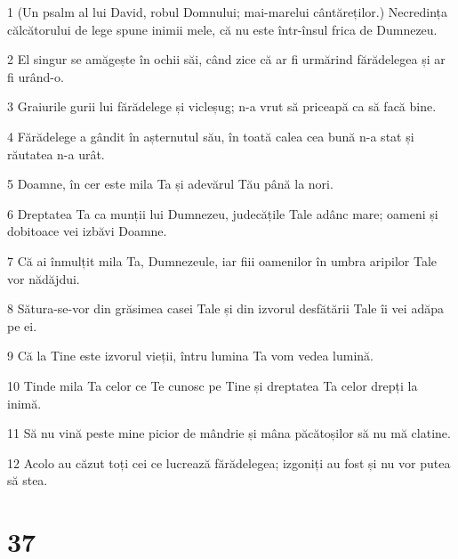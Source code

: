 \par 1 (Un psalm al lui David, robul Domnului; mai-marelui cântăreților.) Necredința călcătorului de lege spune inimii mele, că nu este într-însul frica de Dumnezeu.
\par 2 El singur se amăgește în ochii săi, când zice că ar fi urmărind fărădelegea și ar fi urând-o.
\par 3 Graiurile gurii lui fărădelege și vicleșug; n-a vrut să priceapă ca să facă bine.
\par 4 Fărădelege a gândit în așternutul său, în toată calea cea bună n-a stat și răutatea n-a urât.
\par 5 Doamne, în cer este mila Ta și adevărul Tău până la nori.
\par 6 Dreptatea Ta ca munții lui Dumnezeu, judecățile Tale adânc mare; oameni și dobitoace vei izbăvi Doamne.
\par 7 Că ai înmulțit mila Ta, Dumnezeule, iar fiii oamenilor în umbra aripilor Tale vor nădăjdui.
\par 8 Sătura-se-vor din grăsimea casei Tale și din izvorul desfătării Tale îi vei adăpa pe ei.
\par 9 Că la Tine este izvorul vieții, întru lumina Ta vom vedea lumină.
\par 10 Tinde mila Ta celor ce Te cunosc pe Tine și dreptatea Ta celor drepți la inimă.
\par 11 Să nu vină peste mine picior de mândrie și mâna păcătoșilor să nu mă clatine.
\par 12 Acolo au căzut toți cei ce lucrează fărădelegea; izgoniți au fost și nu vor putea să stea.

\chapter{37}

